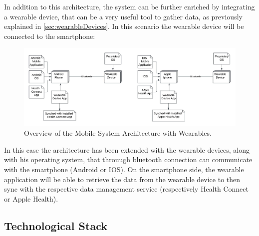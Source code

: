 \noindent In addition to this architecture, the system can be further enriched by integrating a wearable device, that can be a very useful tool to gather data, as previously explained in \cref{sec:wearableDevices}. In this scenario the wearable device will be connected to the smartphone:

\begin{figure}
    \includegraphics[width=1.0\linewidth]{./images/system_architecture_wearable.jpeg}
    \caption{Overview of the Mobile System Architecture with Wearables.}
    \label{fig:systemArchitectureWearables}
\end{figure}

\noindent In this case the architecture has been extended with the wearable devices, along with his operating system, that throuugh bluetooth connection can communicate with the smartphone (Android or IOS). On the smartphone side, the wearable application will be able to retrieve the data from the wearable device to then sync with the respective data management service (respectively Health Connect or Apple Health).

\subsection{Technological Stack}